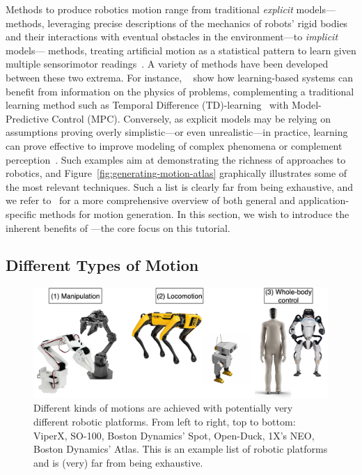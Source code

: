Methods to produce robotics motion range from traditional \emph{explicit} models--- methods, leveraging precise descriptions of the mechanics of robots' rigid bodies and their interactions with eventual obstacles in the environment---to \emph{implicit} models--- methods, treating artificial motion as a statistical pattern to learn given multiple sensorimotor readings~\citep{agrawalComputationalSensorimotorLearning,bekrisStateRobotMotion2024}.
A variety of methods have been developed between these two extrema.
For instance, ~\citet{hansenTemporalDifferenceLearning2022} show how learning-based systems can benefit from information on the physics of problems, complementing a traditional learning method such as Temporal Difference (TD)-learning~\citet{suttonReinforcementLearningIntroduction2018} with Model-Predictive Control (MPC).
Conversely, as explicit models may be relying on assumptions proving overly simplistic---or even unrealistic---in practice, learning can prove effective to improve modeling of complex phenomena or complement perception~\citep{mccormacSemanticFusionDense3D2016}.
Such examples aim at demonstrating the richness of approaches to robotics, and Figure~\ref{fig:generating-motion-atlas} graphically illustrates some of the most relevant techniques.
Such a list is clearly far from being exhaustive, and we refer to~\citet{bekrisStateRobotMotion2024} for a more comprehensive overview of both general and application-specific methods for motion generation.
In this section, we wish to introduce the inherent benefits of ---the core focus on this tutorial.

\subsection{Different Types of Motion}

\begin{figure}
    \centering
    \includegraphics[width=0.7\linewidth]{figures/ch2/ch2-platforms.png}
    \caption{Different kinds of motions are achieved with potentially very different robotic platforms. From left to right, top to bottom: ViperX, SO-100, Boston Dynamics' Spot, Open-Duck, 1X's NEO, Boston Dynamics' Atlas. This is an example list of robotic platforms and is (very) far from being exhaustive.}
    \label{fig:robotics-platforms-atlas}
\end{figure}

